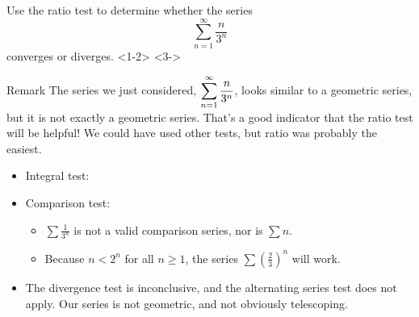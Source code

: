 \begin{frame}[t]
Use the ratio test to determine whether the series \[\sum_{n=1}^\infty \frac{n}{3^n}\] converges or diverges. 
<1-2>
<3->
\vfill
{}
\end{frame}
\begin{frame}[t]{Remark}
The series we just considered, $\displaystyle\sum_{n=1}^\infty \frac{n}{3^n}$, looks similar to a geometric series, but it is not exactly a geometric series. That's a good indicator that the ratio test will be helpful! 
\vfill\pause
We could have used other tests, but ratio was probably the easiest.
\begin{itemize}[<+->]
\item Integral test: 
\item Comparison test: 
\begin{itemize}
\item $\sum\frac{1}{3^n}$ is not a valid comparison series, nor is $\sum n$.
\item Because $n<2^n$ for all $n\ge 1$, the series $\sum\left(\frac23\right)^n$ will work.
\end{itemize}
\item  The divergence test is inconclusive, and the alternating series test does not apply. Our series is not geometric, and not obviously telescoping.
\end{itemize}\vfill

\end{frame}
